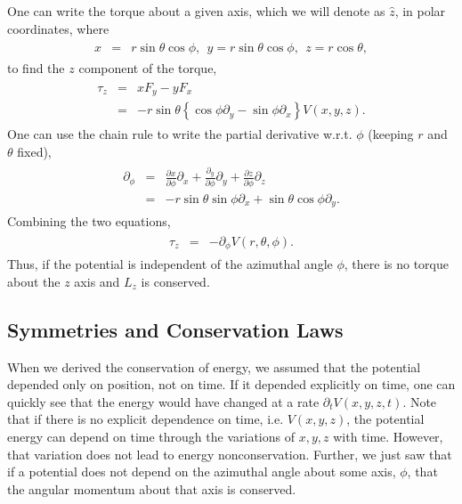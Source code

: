 \documentclass[letterpaper,10pt,english]{sphinxmanual}
\begin{document}
One can write the torque about a given axis, which we will denote as \(\hat{z}\), in polar coordinates, where
\begin{equation*}
\begin{split}
\begin{eqnarray}
x&=&r\sin\theta\cos\phi,~~y=r\sin\theta\cos\phi,~~z=r\cos\theta,
\end{eqnarray}
\end{split}
\end{equation*}
to find the \(z\) component of the torque,
\begin{equation*}
\begin{split}
\begin{eqnarray}
\tau_z&=&xF_y-yF_x\\
\nonumber
&=&-r\sin\theta\left\{\cos\phi \partial_y-\sin\phi \partial_x\right\}V(x,y,z).
\end{eqnarray}
\end{split}
\end{equation*}
One can use the chain rule to write the partial derivative w.r.t. \(\phi\) (keeping \(r\) and \(\theta\) fixed),
\begin{equation*}
\begin{split}
\begin{eqnarray}
\partial_\phi&=&\frac{\partial x}{\partial\phi}\partial_x+\frac{\partial_y}{\partial\phi}\partial_y
+\frac{\partial z}{\partial\phi}\partial_z\\
\nonumber
&=&-r\sin\theta\sin\phi\partial_x+\sin\theta\cos\phi\partial_y.
\end{eqnarray}
\end{split}
\end{equation*}
Combining the two equations,
\begin{equation*}
\begin{split}
\begin{eqnarray}
\tau_z&=&-\partial_\phi V(r,\theta,\phi).
\end{eqnarray}
\end{split}
\end{equation*}
Thus, if the potential is independent of the azimuthal angle \(\phi\),
there is no torque about the \(z\) axis and \(L_z\) is conserved.


\subsection{Symmetries and Conservation Laws}
\label{\detokenize{chapter3:symmetries-and-conservation-laws}}
When we derived the conservation of energy, we assumed that the
potential depended only on position, not on time. If it depended
explicitly on time, one can quickly see that the energy would have
changed at a rate \(\partial_tV(x,y,z,t)\). Note that if there is no
explicit dependence on time, i.e. \(V(x,y,z)\), the potential energy can
depend on time through the variations of \(x,y,z\) with time. However,
that variation does not lead to energy non\sphinxhyphen{}conservation. Further, we
just saw that if a potential does not depend on the azimuthal angle
about some axis, \(\phi\), that the angular momentum about that axis is
conserved.
\end{document}
